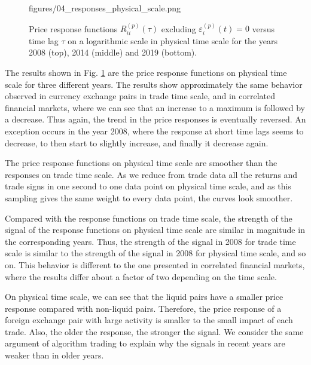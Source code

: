 \begin{figure}[htbp]
    {figures/04_responses_physical_scale.png}
    \caption{Price response functions
             $R^{\left(p\right)}_{ii}\left(\tau\right)$ excluding
             $\varepsilon^{\left(p\right)}_{i}\left(t\right) = 0$ versus time
             lag $\tau$ on a logarithmic scale in physical time scale for the
             years 2008 (top), 2014 (middle) and 2019 (bottom).}
    \label{fig:response_function_physical_scale}
\end{figure}
The results shown in Fig. \ref{fig:response_function_physical_scale} are the
price response functions on physical time scale for three different years. The
results show approximately the same behavior observed in currency exchange
pairs in trade time scale, and in correlated financial markets, where we can
see that an increase to a maximum is followed by a decrease. Thus again, the
trend in the price responses is eventually reversed. An exception occurs in the
year 2008, where the response at short time lags seems to decrease, to then
start to slightly increase, and finally it decrease again.

The price response functions on physical time scale are smoother than the
responses on trade time scale. As we reduce from trade data all the returns and
trade signs in one second to one data point on physical time scale, and as this
sampling gives the same weight to every data point, the curves look smoother.

Compared with the response functions on trade time scale, the strength of the
signal of the response functions on physical time scale are similar in
magnitude in the corresponding years. Thus, the strength of the signal in 2008
for trade time scale is similar to the strength of the signal in 2008 for
physical time scale, and so on. This behavior is different to the one presented
in correlated financial markets, where the results differ about a factor of
two depending on the time scale.

On physical time scale, we can see that the liquid pairs have a smaller price
response compared with non-liquid pairs. Therefore, the price response of a
foreign exchange pair with large activity is smaller to the small impact of
each trade. Also, the older the response, the stronger the signal. We consider
the same argument of algorithm trading to explain why the signals in recent
years are weaker than in older years.

